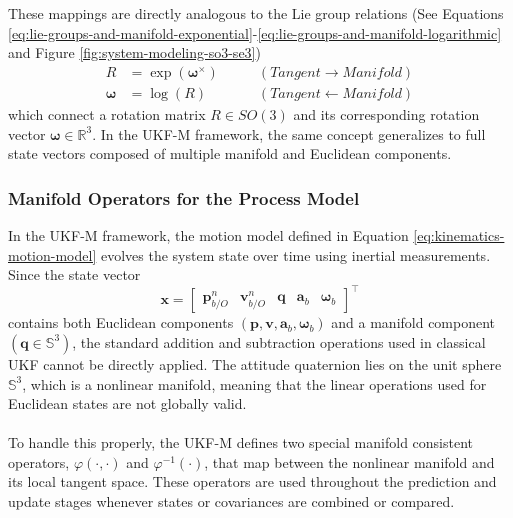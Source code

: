 \\ \\
These mappings are directly analogous to the Lie group relations (See Equations \ref{eq:lie-groups-and-manifold-exponential}-\ref{eq:lie-groups-and-manifold-logarithmic} and Figure \ref{fig:system-modeling-so3-se3})
$$
\begin{aligned}
    R &= \exp(\boldsymbol{\omega}^\times) &\qquad (Tangent \rightarrow Manifold) \\
    \boldsymbol{\omega} &= \log(R) &\qquad (Tangent \leftarrow Manifold)
\end{aligned}
$$
which connect a rotation matrix $R \in SO(3)$ and its corresponding rotation vector $\boldsymbol{\omega} \in \mathbb{R}^3$. In the UKF-M framework, the same concept generalizes to full state vectors composed of multiple manifold and Euclidean components.



\subsubsection{Manifold Operators for the Process Model}
In the UKF-M framework, the motion model defined in Equation \ref{eq:kinematics-motion-model} evolves the system state over time using inertial measurements. Since the state vector
$$
    \mathbf{x} =
    \begin{bmatrix}
        \mathbf{p}_{b/O}^{n} & \mathbf{v}_{b/O}^{n} & \mathbf{q} & \mathbf{a}_b & \mathbf{\omega}_b
    \end{bmatrix}^\top
$$
contains both Euclidean components $(\mathbf{p}, \mathbf{v}, \mathbf{a}_b, \mathbf{\omega}_b)$ and a manifold component $(\mathbf{q} \in \mathbb{S}^3)$, the standard addition and subtraction operations used in classical UKF cannot be directly applied. The attitude quaternion lies on the unit sphere $\mathbb{S}^3$, which is a nonlinear manifold, meaning that the linear operations used for Euclidean states are not globally valid.  
\\ \\
To handle this properly, the UKF-M defines two special manifold consistent operators, $\varphi(\cdot,\cdot)$ and $\varphi^{-1}(\cdot)$, that map between the nonlinear manifold and its local tangent space. These operators are used throughout the prediction and update stages whenever states or covariances are combined or compared.


